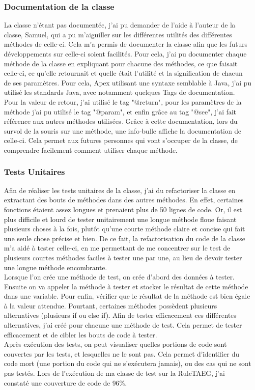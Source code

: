 \documentclass[12pt,oneside,noprintercorrection]{iut}
\begin{document}
 \subsubsection{Documentation de la classe}
La classe n'étant pas documentée, j'ai pu demander de l'aide à l'auteur de la classe, Samuel, qui a pu m'aiguiller sur les différentes utilités des différentes méthodes de celle-ci. Cela m'a permis de documenter la classe afin que les futurs développements sur celle-ci soient facilités. Pour cela, j'ai pu documenter chaque méthode de la classe en expliquant pour chacune des méthodes, ce que faisait celle-ci, ce qu'elle retournait et quelle était l'utilité et la signification de chacun de ses paramètres. Pour cela, Apex utilisant une syntaxe semblable à Java, j'ai pu utilisé les standards Java, avec notamment quelques Tags de documentation. Pour la valeur de retour, j'ai utilisé le tag "@return", pour les paramètres de la méthode j'ai pu utilisé le tag "@param", et enfin grâce au tag "@see", j'ai fait référence aux autres méthodes utilisées. Grâce à cette documentation, lors du survol de la souris sur une méthode, une info-bulle affiche la documentation de celle-ci. Cela permet aux futures personnes qui vont s'occuper de la classe, de comprendre facilement comment utiliser chaque méthode.
\subsubsection{Tests Unitaires}
Afin de réaliser les tests unitaires de la classe, j'ai du refactoriser la classe en extractant des bouts de méthodes dans des autres méthodes. En effet, certaines fonctions étaient assez longues et prenaient plus de 50 lignes de code. Or, il est plus difficile et lourd de tester unitairement une longue méthode floue faisant plusieurs choses à la fois, plutôt qu'une courte méthode claire et concise qui fait une seule chose précise et bien. De ce fait, la refactorisation du code de la classe m'a aidé à tester celle-ci, en me permettant de me concentrer sur le test de plusieurs courtes méthodes faciles à tester une par une, au lieu de devoir tester une longue méthode encombrante.
~\\\indent Lorsque l'on crée une méthode de test, on crée d'abord des données à tester. Ensuite on va appeler la méthode à tester et stocker le résultat de cette méthode dans une variable. Pour enfin, vérifier que le résultat de la méthode est bien égale à la valeur attendue.
Pourtant, certaines méthodes possèdent plusieurs alternatives (plusieurs if ou else if). Afin de tester efficacement ces différentes alternatives, j'ai créé pour chacune une méthode de test. Cela permet de tester efficacement et de cibler les bouts de code à tester.
~\\\indent Après exécution des tests, on peut visualiser quelles portions de code sont couvertes par les tests, et lesquelles ne le sont pas. Cela permet d'identifier du code mort (une portion du code qui ne s'exécutera jamais), ou des cas qui ne sont pas testés. Lors de l'exécution de ma classe de test sur la RuleTAEG, j'ai constaté une couverture de code de 96\%.
\end{document}
